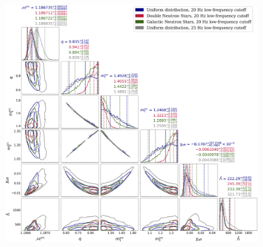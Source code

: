 \begin{figure}
\begin{adjustwidth}{-1.5cm}{-0.8cm}
\centering
  \includegraphics[width=\columnwidth]{figures/common_eos/posteriors_main_bothspins.png}

\end{adjustwidth}
\end{figure}
